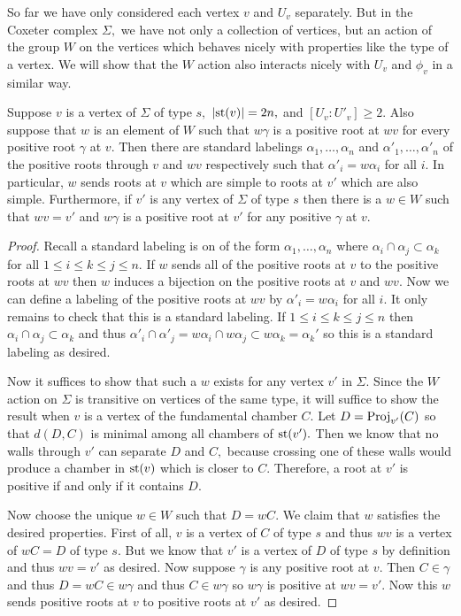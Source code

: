 \documentclass[class=book, crop=false,12 pt]{standalone}
\begin{document}
So far we have only considered each vertex $v$ and $U_v$ separately. But in the Coxeter complex $\Sigma,$ we have not only a collection of vertices, but an action of the group $W$ on the vertices which behaves nicely with properties like the type of a vertex. We will show that the $W$ action also interacts nicely with $U_v$ and $\phi_v$ in a similar way.

\begin{lemma}
	\label{lem:resporder}
	Suppose $v$ is a vertex of $\Sigma$ of type $s,$ $|\mathrm{st}(v)|=2n,$ and $[U_v:U'_v]\ge 2.$ Also suppose that $w$ is an element of $W$ such that $w\gamma$ is a positive root at $wv$ for every positive root $\gamma$ at $v.$ Then there are standard labelings $\alpha_1,\dots,\alpha_n$ and $\alpha'_1,\dots,\alpha'_n$ of the positive roots through $v$ and $wv$ respectively such that $\alpha'_i=w\alpha_i$ for all $i.$ In particular, $w$ sends roots at $v$ which are simple to roots at $v'$ which are also simple. Furthermore, if $v'$ is any vertex of $\Sigma$ of type $s$ then there is a $w\in W$ such that $wv=v'$ and $w\gamma$ is a positive root at $v'$ for any positive $\gamma$ at $v.$
\end{lemma}
\begin{proof}
	Recall a standard labeling is on of the form $\alpha_1,\dots, \alpha_n$ where $\alpha_i\cap \alpha_j\subset \alpha_k$ for all $1\le i\le k\le j\le n.$ If $w$ sends all of the positive roots at $v$ to the positive roots at $wv$ then $w$ induces a bijection on the positive roots at $v$ and $wv.$ Now we can define a labeling of the positive roots at $wv$ by $\alpha'_i=w\alpha_i$ for all $i.$ It only remains to check that this is a standard labeling. If $1\le i\le k\le j\le n$ then $\alpha_i\cap \alpha_j\subset \alpha_k$ and thus $\alpha'_i\cap \alpha'_j=w\alpha_i\cap w\alpha_j\subset w\alpha_k=\alpha_k'$ so this is a standard labeling as desired.

Now it suffices to show that such a $w$ exists for any vertex $v'$ in $\Sigma.$ Since the $W$ action on $\Sigma$ is transitive on vertices of the same type, it will suffice to show the result when $v$ is a vertex of the fundamental chamber $C.$ Let $D=\mathrm{Proj}_{v'}(C)$ so that $d(D,C)$ is minimal among all chambers of $\mathrm{st}(v').$ Then we know that no walls through $v'$ can separate $D$ and $C,$ because crossing one of these walls would produce a chamber in $\mathrm{st}(v)$ which is closer to $C.$ Therefore, a root at $v'$ is positive if and only if it contains $D.$

Now choose the unique $w\in W$ such that $D=wC.$ We claim that $w$ satisfies the desired properties. First of all, $v$ is a vertex of $C$ of type $s$ and thus $wv$ is a vertex of $wC=D$ of type $s.$ But we know that $v'$ is a vertex of $D$ of type $s$ by definition and thus $wv=v'$ as desired. Now suppose $\gamma$ is any positive root at $v.$ Then $C\in \gamma$ and thus $D=wC\in w\gamma$ and thus $C\in w\gamma$ so $w\gamma$ is positive at $wv=v'.$ Now this $w$ sends positive roots at $v$ to positive roots at $v'$ as desired.

\end{proof}
\end{document}
